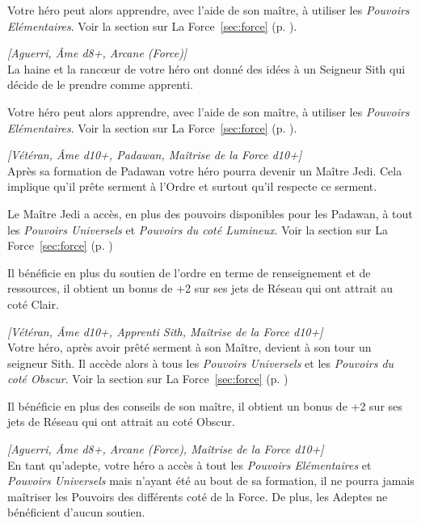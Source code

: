 \begin{description}[align=left]
        Votre héro peut alors apprendre, avec l’aide de son maître, à utiliser les \emph{Pouvoirs \’Elémentaires}. Voir la section sur La Force~\ref{sec:force} (p. \pageref{sec:force}).

    \item [Apprenti Sith]
        \emph{[Aguerri, \^Ame d8+, Arcane (Force)]}\\
        La haine et la ranc\oe{ur} de votre héro ont donné des idées à un Seigneur Sith qui décide de le prendre comme apprenti.

        Votre héro peut alors apprendre, avec l’aide de son maître, à utiliser les \emph{Pouvoirs \’Elémentaires}. Voir la section sur La Force~\ref{sec:force} (p. \pageref{sec:force}).

    \item [Maître Jedi]
        \emph{[Vétéran, \^Ame d10+, Padawan, Maîtrise de la Force d10+]}\\
        Après sa formation de Padawan votre héro pourra devenir un Maître Jedi. Cela implique qu’il prête serment à l’Ordre et surtout qu’il respecte ce serment.

        Le Maître Jedi a accès, en plus des pouvoirs disponibles pour les Padawan, à tout les \emph{Pouvoirs Universels} et \emph{Pouvoirs du coté Lumineux}. Voir la section sur La Force~\ref{sec:force} (p. \pageref{sec:force})

        Il bénéficie en plus du soutien de l’ordre en terme de renseignement et de ressources, il obtient un bonus de +2 sur ses jets de Réseau qui ont attrait au coté Clair.

    \item [Seigneur Sith]
        \emph{[Vétéran, \^Ame d10+, Apprenti Sith, Maîtrise de la Force d10+]}\\
        Votre héro, après avoir prêté serment à son Maître, devient à son tour un seigneur Sith. Il accède alors à tous les \emph{Pouvoirs Universels} et les \emph{Pouvoirs du coté Obscur}. Voir la section sur La Force~\ref{sec:force} (p. \pageref{sec:force})

        Il bénéficie en plus des conseils de son maître, il obtient un bonus de +2 sur ses jets de Réseau qui ont attrait au coté Obscur.

    \item [Adepte Sauvage]
        \emph{[Aguerri, \^Ame d8+, Arcane (Force), Maîtrise de la Force d10+]}\\
        En tant qu’adepte, votre héro a accès à tout les \emph{Pouvoirs \’Elémentaires} et \emph{Pouvoirs Universels} mais n’ayant été au bout de sa formation, il ne pourra jamais maîtriser les Pouvoirs des différents coté de la Force. De plus, les Adeptes ne bénéficient d’aucun soutien.


\end{description}
